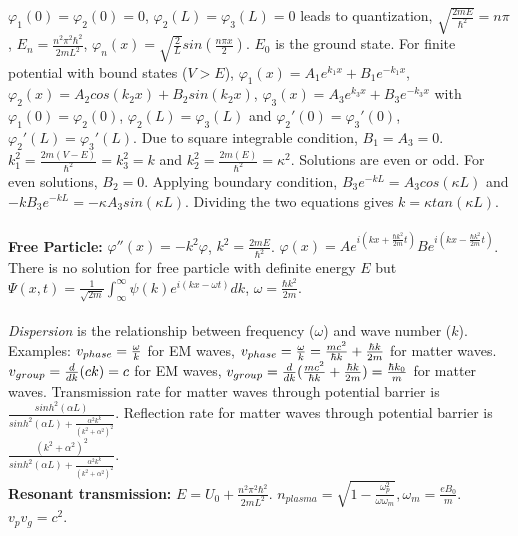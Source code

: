 $\varphi_1(0)= \varphi_2(0)=0$,
$\varphi_2(L)= \varphi_3(L)=0$ leads to quantization, 
${\sqrt {\frac {2mE}{\hbar^2}}} = n \pi$, $E_n= {\frac {n^2 \pi^2 \hbar^2} {2mL^2}}$,  
$\varphi_n(x)= {\sqrt {\frac 2 L}} sin({\frac {n \pi x} 2})$.  $E_0$ is the ground state.
For finite potential with bound states ($V>E$),
$\varphi_1(x)= A_1 e^{k_1 x} +B_1 e^{-k_1 x}$,
$\varphi_2(x)= A_2 cos(k_2 x) +B_2 sin(k_2 x)$,
$\varphi_3(x)= A_3 e^{k_3 x} +B_3 e^{-k_3 x}$
with $\varphi_1(0)= \varphi_2(0)$, $\varphi_2(L)= \varphi_3(L)$ and
$\varphi_2'(0)= \varphi_3'(0)$, $\varphi_2'(L)= \varphi_3'(L)$.  Due to square integrable
condition, $B_1=A_3=0$. 
$k_1^2= {\frac {2m(V-E)}{\hbar^2}}= k_3^2=k$ and
$k_2^2= {\frac {2m(E)}{\hbar^2}}= \kappa^2$.  Solutions are even or odd.  For even
solutions, $B_2=0$.
Applying boundary condition, 
$B_3 e^{-kL}=A_3 cos(\kappa L)$ and
$-k B_3 e^{-kL}= - \kappa A_3 sin(\kappa L)$.  Dividing the two equations gives
$k= \kappa tan(\kappa L)$.
\\
\\
{\bf Free Particle:} 
$\varphi''(x)= - k^2 \varphi$, $k^2= {\frac {2mE} {\hbar^2}}$.
$\varphi(x)= A e^{i(kx+{\frac {\hbar k^2}{2m}}t)}
B e^{i(kx-{\frac {\hbar k^2}{2m}}t)}$.  There is no solution for free particle with 
definite energy $E$ but $\Psi(x,t)= {\frac 1 {\sqrt {2m}}} \int_{\infty}^{\infty} \psi(k)
e^{i(kx- \omega t)} dk$, $\omega= {\frac {\hbar k^2}{2m}}$.
\\
\\
\emph{Dispersion} is the relationship between frequency ($\omega$)
and wave number ($k$).  Examples:
$v_{\small {phase}} = {\frac {\omega} {k}}$ for EM waves,
$v_{\small {phase}} = 
{\frac {\omega} {k}} = {\frac {mc^2} { \hbar k}} + {\frac {\hbar k} {2m}} $ for matter waves.
$v_{\small {group}} = {\frac {d} {dk}} (ck)= c$ for EM waves,
$v_{\small {group}} = 
{\frac {d} {dk}} ({\frac {mc^2} { \hbar k}} + {\frac {\hbar k} {2m}} )
= {\frac {\hbar k_0} {m}}$ for matter waves.
Transmission rate for matter waves through potential barrier is
${\frac { sinh^2( \alpha L)}
{sinh^2( \alpha L) + {\frac {\alpha^2 k^k} {(k^2 + \alpha^2)^2}}} }$.
Reflection rate for matter waves through potential barrier is
${\frac {(k^2 + \alpha^2)^2} {sinh^2( \alpha L) + 
{\frac {\alpha^2 k^k} {(k^2 + \alpha^2)^2} }} }$.
\\
{\bf Resonant transmission:} $E = U_0 + {\frac {n^2 \pi^2 \hbar^2} {2 m L^2}}$.
$n_{plasma}= {\sqrt {1- {\frac {\omega_p^2} {\omega \omega_m}}}}, \omega_m= {\frac {e B_0}{m}}$.
$v_p v_g= c^2$.
\\
\\
